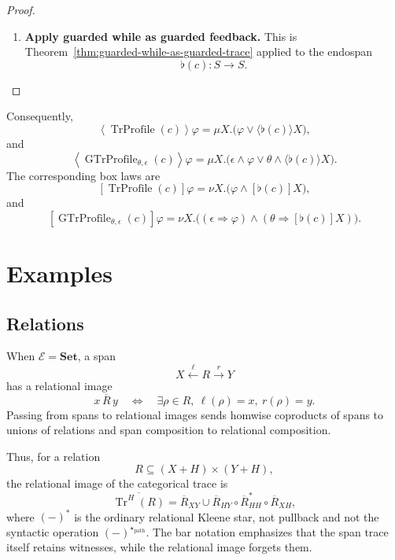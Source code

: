 \begin{proof}
\begin{enumerate}
  \item \textbf{Apply guarded while as guarded feedback.}
  This is Theorem~\ref{thm:guarded-while-as-guarded-trace} applied to the
  endospan
  \[
    \flat(c):S\to S.
  \]
\end{enumerate}
\end{proof}

Consequently,
\[
  \left\langle
    \operatorname{TrProfile}(c)
  \right\rangle\varphi
  =
  \mu X.
  \bigl(
    \varphi\vee\langle\flat(c)\rangle X
  \bigr),
\]
and
\[
  \left\langle
    \operatorname{GTrProfile}_{\theta,\epsilon}(c)
  \right\rangle\varphi
  =
  \mu X.
  \bigl(
    \epsilon\wedge\varphi
    \vee
    \theta\wedge\langle\flat(c)\rangle X
  \bigr).
\]
The corresponding box laws are
\[
  \left[
    \operatorname{TrProfile}(c)
  \right]\varphi
  =
  \nu X.
  \bigl(
    \varphi\wedge[\flat(c)]X
  \bigr),
\]
and
\[
  \left[
    \operatorname{GTrProfile}_{\theta,\epsilon}(c)
  \right]\varphi
  =
  \nu X.
  \bigl(
    (\epsilon\Rightarrow\varphi)
    \wedge
    (\theta\Rightarrow[\flat(c)]X)
  \bigr).
\]

\section{Examples}
\label{sec:feedback-trace-examples}

\subsection{Relations}
\label{subsec:feedback-relations}

When \(\mathcal E=\mathbf{Set}\), a span
\[
  X\xleftarrow{\ell}R\xrightarrow{r}Y
\]
has a relational image
\[
  x\,\overline R\,y
  \quad\Longleftrightarrow\quad
  \exists \rho\in R,\ \ell(\rho)=x,\ r(\rho)=y.
\]
Passing from spans to relational images sends homwise coproducts of spans to
unions of relations and span composition to relational composition.

Thus, for a relation
\[
  R\subseteq (X+H)\times(Y+H),
\]
the relational image of the categorical trace is
\[
  \overline{\operatorname{Tr}^{H}(R)}
  =
  \overline{R}_{XY}
  \cup
  \overline{R}_{HY}\circ
  \overline{R}_{HH}^{\ast}\circ
  \overline{R}_{XH},
\]
where \((-)^\ast\) is the ordinary relational Kleene star, not pullback and not
the syntactic operation \((-)^{\star_{\mathrm{path}}}\). The bar notation
emphasizes that the span trace itself retains witnesses, while the relational
image forgets them.

